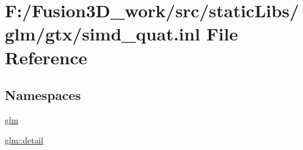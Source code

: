 \hypertarget{simd__quat_8inl}{}\section{F\+:/\+Fusion3\+D\+\_\+work/src/static\+Libs/glm/gtx/simd\+\_\+quat.inl File Reference}
\label{simd__quat_8inl}
\subsection*{Namespaces}
\begin{DoxyCompactItemize}
\item 
 \hyperlink{namespaceglm}{glm}
\item 
 \hyperlink{namespaceglm_1_1detail}{glm\+::detail}
\end{DoxyCompactItemize}
